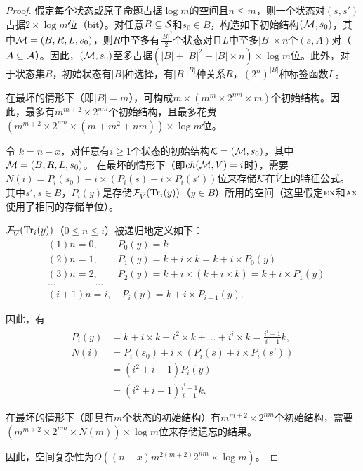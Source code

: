 \begin{proof}
	假定每个状态或原子命题占据$\log m$的空间且$n\leq m$，则一个状态对$(s,s')$占据$2\times \log m$位（bit）。对任意$B \subseteq {\cal S}$和$s_0\in B$，构造如下初始结构$({\cal M},s_0)$，其中${\cal M} = (B,R,L,s_0)$，则$R$中至多有$\frac{|B|^2}{2}$个状态对且$L$中至多$|B|\times n$个$(s,A)$对（$A\subseteq {\cal A}$）。因此，$({\cal M},s_0)$至多占据$(|B|+|B|^2+|B|\times n)\times \log m$位。此外，对于状态集$B$，初始状态有$|B|$种选择，有$|B|^{|B|}$种关系$R$，$(2^n)^{|B|}$种标签函数$L$。
	
	在最坏的情形下（即$|B|=m$），可构成$m \times  (m^m \times  2^{nm} \times  m)$个初始结构。因此，最多有$m^{m+2} \times  2^{nm}$个初始结构，且最多花费$(m^{m+2} \times  2^{nm} \times  (m + m^2 + nm))\times  \log m$位。
	
	令 $k = n-x$，对任意有$i\geq 1$个状态的初始结构${\cal K} = ({\cal M},s_0)$，其中${\cal M} = (B,R,L,s_0)$。
	在最坏的情形下（即$ch({\cal M},V) = i$时），需要$N(i) = P_i(s_0) + i \times  (P_i(s) + i \times P_i(s'))$位来存储${\cal K}$在$\overline{V}$上的特征公式。
	其中$s',s\in B$，$P_i(y)$是存储${\cal F}_{\overline{V}}(\textrm{Tr}_i(y))$（$y\in B$）所用的空间（这里假定$\textsc{e}\textsc{x}$和$\textsc{a}\textsc{x}$使用了相同的存储单位）。
	
	${\cal F}_{\overline{V}}(\textrm{Tr}_i(y))$（$0\leq n \leq i$）被递归地定义如下：
	\begin{align*}
		&(1) n=0,  \qquad P_0(y) = k\\
		&(2) n=1, \qquad  P_1(y) = k + i\times k = k + i\times P_0(y)\\
		&(3) n=2, \qquad P_2(y) = k + i\times (k + i\times k) = k+i\times P_1(y)\\
		& \dots \qquad \qquad \dots\\
		&(i+1) n = i, \quad P_i(y) = k + i \times  P_{i-1}(y).
	\end{align*}
	
	因此，有
	\begin{align*}
		P_i(y) & = k + i\times k + i^2 \times  k + \dots + i^i \times  k = \frac{i^i -1}{i-1} k,\\
		N(i) & = P_i(s_0) + i\times  (P_i(s) + i \times  P_i(s'))\\
		& = (i^2 + i +1) P_i(y) \\
		& = (i^2 + i+1)\frac{i^i -1}{i-1} k.
	\end{align*}
	
	在最坏的情形下（即具有$m$个状态的初始结构）有$m^{m+2} \times  2^{nm}$个初始结构，需要$(m^{m+2} \times  2^{nm} \times  N(m)) \times  \log m$位来存储遗忘的结果。
	
	因此，空间复杂性为$O((n-x)m^{2(m+2)}2^{nm}\times  \log m)$。
\end{proof}



